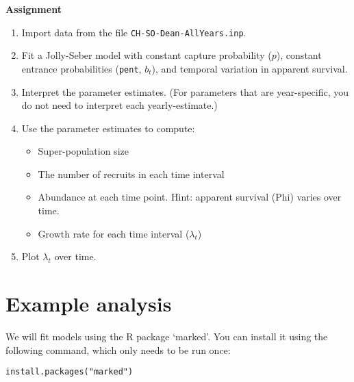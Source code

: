 \documentclass[12pt]{article}\usepackage[]{graphicx}\usepackage[]{xcolor}
\makeatletter
\newcommand{\hlsng}[1]{\textcolor[rgb]{0.749,0.012,0.012}{#1}}%
\newcommand{\hldef}[1]{\textcolor[rgb]{0,0,0}{#1}}%
\newcommand{\hlkwd}[1]{\textcolor[rgb]{0.004,0.004,0.506}{#1}}%
\newenvironment{kframe}{%
 \def\at@end@of@kframe{}%
 \ifinner\ifhmode%
  \def\at@end@of@kframe{\end{minipage}}%
  \begin{minipage}{\columnwidth}%
 \fi\fi%
 \def\FrameCommand##1{\hskip\@totalleftmargin \hskip-\fboxsep
 \colorbox{shadecolor}{##1}\hskip-\fboxsep
     \hskip-\linewidth \hskip-\@totalleftmargin \hskip\columnwidth}%
 \MakeFramed {\advance\hsize-\width
   \@totalleftmargin\z@ \linewidth\hsize
   \@setminipage}}%
 {\par\unskip\endMakeFramed%
 \at@end@of@kframe}
\newenvironment{knitrout}{}{} %
\makeatother
\begin{document}

{\bf Assignment}

\begin{enumerate}
  \item Import data from the file \texttt{CH-SO-Dean-AllYears.inp}.
  \item Fit a Jolly-Seber model with constant capture probability
    ($p$), constant entrance probabilities (\texttt{pent}, $b_t$), and
    temporal variation in apparent survival.
  \item Interpret the parameter estimates. (For parameters that are
    year-specific, you do not need to interpret each yearly-estimate.) 
  \item Use the parameter estimates to compute:
    \begin{itemize}
      \item Super-population size
      \item The number of recruits in each time interval
      \item Abundance at each time point. Hint: apparent survival
        (Phi) varies over time.
      \item Growth rate for each time interval ($\lambda_t$)
    \end{itemize}
  \item Plot $\lambda_t$ over time.
\end{enumerate}


\clearpage

\section*{Example analysis}




We will fit models using the R package `marked'. You can install it
using the following command, which only needs to be run once: 

\begin{knitrout}
\color{fgcolor}\begin{kframe}
\begin{alltt}
\hlkwd{install.packages}\hldef{(}\hlsng{"marked"}\hldef{)}
\end{alltt}
\end{kframe}
\end{knitrout}
\end{document}
